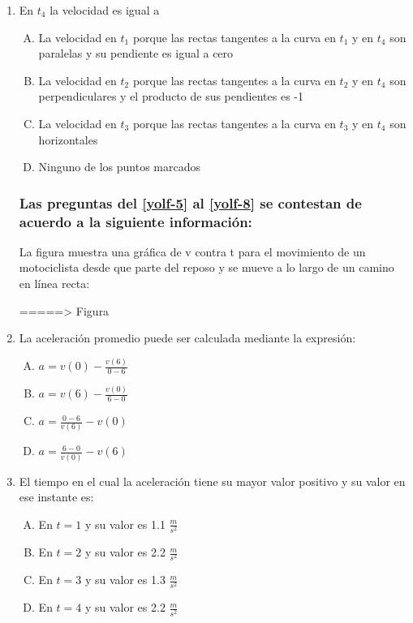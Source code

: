\begin{enumerate}
\item  En $t_4$ la velocidad es igual a\label{yolf-4}\\

\begin{enumerate}[(A)]
\item La velocidad en $t_1$ porque las rectas tangentes a la curva en $t_1$ y en $t_4$ son paralelas y su pendiente es igual a cero
\item  La velocidad en $t_2$ porque las rectas tangentes a la curva en $t_2$ y en $t_4$ son perpendiculares y el producto de sus pendientes es -1
\item  La velocidad en $t_3$ porque las rectas tangentes a la curva en $t_3$ y en $t_4$ son horizontales
\item  Ninguno de los puntos marcados

\end{enumerate}

\subsubsection*{Las preguntas del \ref{yolf-5} al \ref{yolf-8} se contestan de acuerdo a la siguiente información:}

\noindent La figura muestra una gráfica de v contra t para el movimiento de un motociclista desde que parte del reposo y se mueve a lo largo de un camino en línea recta:

=====> Figura

\item  La aceleración promedio puede ser calculada mediante la expresión: \label{yolf-5}\\

\begin{enumerate}[(A)]
\item  $a= v(0)-\frac{v(6)}{0-6}$
\item  $a= v(6)-\frac{v(0)}{6-0}$
\item  $a= \frac{0-6}{v(6)}-v(0)$
\item $a=\frac{6-0}{v(0)}-v(6)$

\end{enumerate}

\item El tiempo en el cual la aceleración tiene su mayor valor positivo y su valor en ese instante es: \label{yolf-6}\\

\begin{enumerate}[(A)]
\item  En $t=1$ y su valor es 1.1 $\frac{m}{s^2}$
\item  En $t=2$ y su valor es 2.2 $\frac{m}{s^2}$
\item  En $t=3$ y su valor es 1.3 $\frac{m}{s^2}$
\item  En $t=4$ y su valor es  2.2 $\frac{m}{s^2}$
\end{enumerate}


\end{enumerate}
